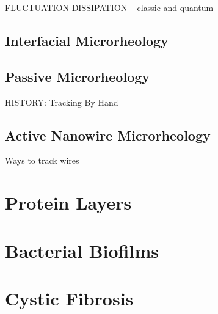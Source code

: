 \begin{equation}
\end{equation}

\begin{equation}
\end{equation}

FLUCTUATION-DISSIPATION -- classic and quantum

\subsection{Interfacial Microrheology}

\subsection{Passive Microrheology}
HISTORY: Tracking By Hand


\subsection{Active Nanowire Microrheology}

Ways to track wires

\section{Protein Layers}
\section{Bacterial Biofilms}
\section{Cystic Fibrosis}